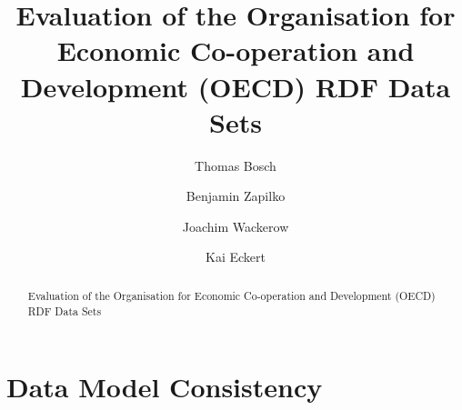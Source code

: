 \documentclass{llncs}
\begin{document}
\renewcommand{\arraystretch}{1.3}
%
%
\title{Evaluation of the Organisation for Economic Co-operation and Development (OECD) RDF Data Sets}
\subtitle{}

%
\author{Thomas Bosch \and Benjamin Zapilko \and Joachim Wackerow \and Kai Eckert}
%
\authorrunning{} %
%

\maketitle              %

\begin{abstract}
Evaluation of the Organisation for Economic Co-operation and Development (OECD) RDF Data Sets


\end{abstract}

\section{Data Model Consistency}
\end{document}
